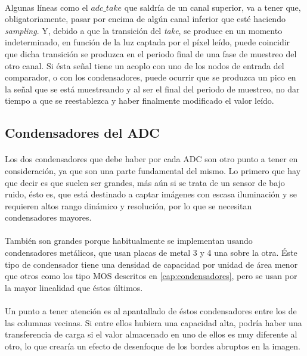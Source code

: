 \paragraph{}
Algunas líneas como el $adc\_take$ que saldría de un canal superior, va a tener que,
obligatoriamente, pasar por encima de algún canal inferior que esté haciendo
\textit{sampling}. Y, debido a que la transición del \textit{take}, se produce
en un momento indeterminado, en función de la luz captada por el píxel leído, puede
coincidir que dicha transición se produzca en el periodo final de una fase de
muestreo del otro canal. Si ésta señal tiene un acoplo con uno de los nodos de
entrada del comparador, o con los condensadores, puede ocurrir que se produzca
un pico en la señal que se está muestreando y al ser el final del periodo de muestreo,
no dar tiempo a que se reestablezca y haber finalmente modificado el valor leído.

\subsection{Condensadores del ADC}

\paragraph{}
Los dos condensadores que debe haber por cada ADC son otro punto a tener en
consideración, ya que son una parte fundamental del mismo. Lo primero que
hay que decir es que suelen ser grandes, más aún si se trata de un sensor de
bajo ruido, ésto es, que está destinado a captar imágenes con escasa iluminación
y se requieren altos rango dinámico y resolución, por lo que se necesitan condensadores
mayores.

\paragraph{}
También son grandes porque habitualmente se implementan usando condensadores
metálicos, que usan placas de metal 3 y 4 una sobre la otra. Éste tipo de condensador
tiene una densidad de capacidad por unidad de área menor que otros como los tipo
MOS descritos en \ref{cap:condensadores}, pero se usan por la mayor linealidad que
éstos últimos.

\paragraph{}
Un punto a tener atención es al apantallado de éstos condensadores entre los de
las columnas vecinas. Si entre ellos hubiera una capacidad alta, podría haber
una transferencia de carga si el valor almacenado en uno de ellos es muy diferente
al otro, lo que crearía un efecto de desenfoque de los bordes abruptos en la imagen.

